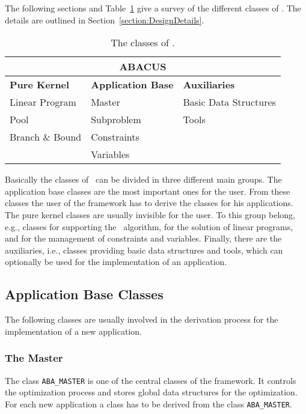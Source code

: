 The following sections and Table~\ref{table:abacusClasses}
give a survey of the different 
classes of \ABACUS. The details are outlined in
Section~\ref{section:DesignDetails}.

\begin{table}[htp]
\begin{center}
\begin{tabular}{|l|l|l|}
\hline
\multicolumn{3}{|c|}{\bf ABACUS}\\
\hline
{\bf Pure Kernel} & {\bf Application Base} & {\bf Auxiliaries}\\
Linear Program & Master      & Basic Data Structures  \\
Pool           & Subproblem  & Tools \\
Branch \& Bound & Constraints &  \\
& Variables &  \\
\hline
\end{tabular}
\caption{The classes of \ABACUS.}
\label{table:abacusClasses}
\end{center}
\end{table}

\noindent
Basically the classes of \ABACUS\ can be divided in three different main
groups.
The application base classes
are the most important ones for the user. From these classes
the user of the framework has to derive the classes for his
applications. The pure kernel classes
are usually invisible for the user.
To this group belong, e.g.,
classes for supporting the \bab\ algorithm, for the solution
of linear programs, and for the management of constraints and variables.
Finally, there are the auxiliaries,
i.e., classes providing basic
data structures and tools, which can optionally be used for the
implementation of an application.

\subsection{Application Base Classes}

The following classes are usually involved in the derivation process
for the implementation of a new application.

\subsubsection{The Master}

The class {\tt ABA\_MASTER}
is one of the central classes of the framework.
It controls the optimization process and stores global data structures
for the optimization. For each new application a class has to be
derived from the class {\tt ABA\_MASTER}.

